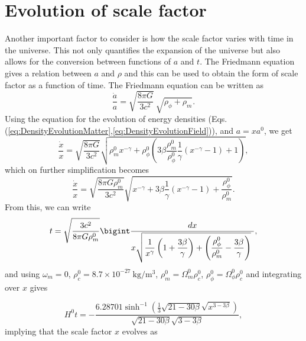 \documentclass[preprint,aps,floatfix]{revtex4}
\def\nn{\nonumber}
\begin{document}
    \section{Evolution of scale factor}
    \label{sec: scale}
\noindent
    Another important  factor to consider is how the scale factor varies with time in the universe. This not only quantifies the expansion of the universe but also allows for the conversion between functions of $a$ and $t$. The Friedmann equation gives a relation between $a$ and $\rho$ and this can be used to obtain the form of scale factor as a function of time.
    The Friedmann equation can be written as
    \begin{equation}
        \frac{\dot{a}}{a} = \sqrt{\frac{8\pi G}{3c^2}} ~\sqrt{\rho_\phi + \rho_m} .
    \end{equation}
    Using the equation for the evolution of energy densities (Eqs.(\ref{eq:DensityEvolutionMatter},\ref{eq:DensityEvolutionField})), and $a = xa^0$, we get
    \begin{equation}
        \frac{\dot{x}}{x} = \sqrt{\frac{8\pi G}{3c^2}} \sqrt{\rho_m^0 x^{-\gamma} + \rho_\phi^0 \left(3\beta \frac{\rho_m^0}{\rho_\phi^0}\frac{1}{\gamma}\left( x^{-\gamma} - 1\right) + 1 \right) },\nn
    \end{equation}
    which on further simplification becomes
    \begin{equation}
        \frac{\dot{x}}{x} = \sqrt{\frac{8\pi G\rho_m^0}{3c^2}} \sqrt{ x^{-\gamma} + 3\beta \frac{1}{\gamma}\left( x^{-\gamma} - 1\right) + \frac{\rho_\phi^0}{\rho_m^0} }.
    \end{equation}
    From this, we can write
    \begin{equation}
        t = \sqrt{\frac{3c^2}{8\pi G\rho_m^0}} \bigint \frac{dx}{  x \sqrt{\displaystyle \frac{1}{x^{\gamma}} \left(1 + \frac{3\beta}{\gamma} \right) +\left(\frac{\rho_\phi^0}{\rho_m^0} -\frac{3\beta }{\gamma}\right) }  ~},
    \end{equation}
    and using $\omega_m = 0$, $\rho_c^0=8.7\times 10^{-27} ~\mathrm{kg/m^3}$, $\rho_m^0=\Omega_m^0 \rho_c^0$, $\rho_\phi^0=\Omega_\phi^0 \rho_c^0$  and integrating over $x$ gives 

    \begin{equation}
        H^0 t = -\frac{6.28701 \sinh ^{-1}\left(\displaystyle\frac{1}{3} \sqrt{21-30 \beta} \sqrt{x^{3-3\beta}}\right)}{\sqrt{21-30 \beta } \sqrt{3-3\beta }}\nn,
    \end{equation}
    implying that the scale factor $x$ evolves as
\end{document}
